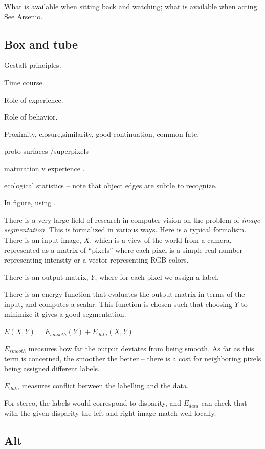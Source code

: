 What is available when sitting back and watching; 
what is available when acting.  See Arsenio.



\subsection{Box and tube}



Gestalt principles.

Time course.

Role of experience.

Role of behavior.

Proximity, closure,similarity, good continuation, common fate.

proto-surfaces /superpixels

maturation v experience \cite{quinn05learning}.

ecological statistics \cite{martin04learning} -- note
that object edges are subtle to recognize.

In figure, using \cite{felzenszwalb04efficient}.

There is a very large field of research in computer vision on the
problem of {\it image segmentation}.  This is formalized in various
ways.  Here is a typical formalism.  There is an input image, $X$,
which is a view of the world from a camera, represented
as a matrix of ``pixels'' where each pixel is a simple
real number representing intensity or a vector representing
RGB colors.

There is an output matrix, $Y$, where for each pixel we assign
a label.

There is an energy function that evaluates the output matrix
in terms of the input, and computes a scalar.  This function
is chosen such that choosing $Y$ to minimize it gives a
good segmentation.

$E(X,Y) = E_{smooth}(Y) + E_{data}(X,Y)$

$E_{smooth}$ measures how far the output deviates from being
smooth.  As far as this term is concerned, the smoother the
better -- there is a cost for neighboring pixels being 
assigned different labels.

$E_{data}$ measures conflict between the labelling and
the data.  

For stereo, the labels would correspond to disparity,
and $E_{data}$ can check that with the given disparity
the left and right image match well locally.


\subsection{Alt}

